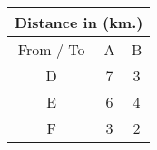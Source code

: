 \begin{center}
\begin{tabular}{|c|c|c|}
\hline
\multicolumn{3}{|c|}{Distance in (km.)}\\ \hline
From / To	&A	&B\\ \hline
D	&7	&3\\ \hline
E	&6	&4\\ \hline
F	&3	&2\\ \hline
\end{tabular}
\end{center}
